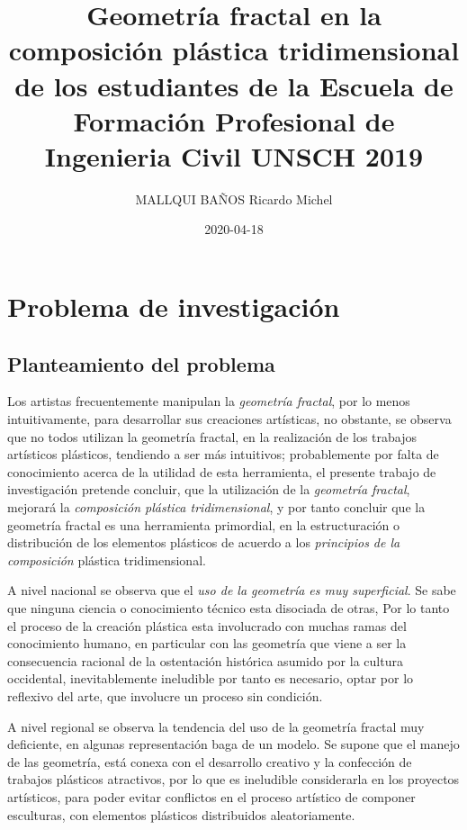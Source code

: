 \documentclass[12pt,]{report}
\title{Geometría fractal en la composición plástica tridimensional de los estudiantes de la Escuela de Formación Profesional de Ingenieria Civil UNSCH 2019}
\author{MALLQUI BAÑOS Ricardo Michel}
\date{2020-04-18}
\begin{document}
\maketitle

{
\setcounter{tocdepth}{1}
\tableofcontents
}
\hypertarget{problema-de-investigaciuxf3n}{%
\chapter{Problema de investigación}\label{problema-de-investigaciuxf3n}}

\hypertarget{planteamiento-del-problema}{%
\section{Planteamiento del problema}\label{planteamiento-del-problema}}

Los artistas frecuentemente manipulan la \emph{geometría fractal}, por lo menos intuitivamente,
para desarrollar sus creaciones artísticas, no obstante, se observa que no todos
utilizan la geometría fractal, en la realización de los trabajos artísticos plásticos, tendiendo
a ser más intuitivos; probablemente por falta de conocimiento acerca de la utilidad
de esta herramienta, el presente trabajo de investigación pretende concluir, que la utilización
de la \emph{geometría fractal}, mejorará la \emph{composición plástica tridimensional}, y por
tanto concluir que la geometría fractal es una herramienta primordial, en la estructuración
o distribución de los elementos plásticos de acuerdo a los \emph{principios de la composición}
plástica tridimensional.

A nivel nacional se observa que el \emph{uso de la geometría es muy superficial}. Se sabe
que ninguna ciencia o conocimiento técnico esta disociada de otras, Por lo tanto el proceso
de la creación plástica esta involucrado con muchas ramas del conocimiento humano,
en particular con las geometría que viene a ser la consecuencia racional de la ostentación
histórica asumido por la cultura occidental, inevitablemente ineludible por tanto es
necesario, optar por lo reflexivo del arte, que involucre un proceso sin condición.

A nivel regional se observa la tendencia del uso de la geometría fractal muy deficiente,
en algunas representación baga de un modelo. Se supone que el manejo de las
geometría, está conexa con el desarrollo creativo y la confección de trabajos plásticos
atractivos, por lo que es ineludible considerarla en los proyectos artísticos, para poder
evitar conflictos en el proceso artístico de componer esculturas, con elementos plásticos
distribuidos aleatoriamente.
\end{document}
